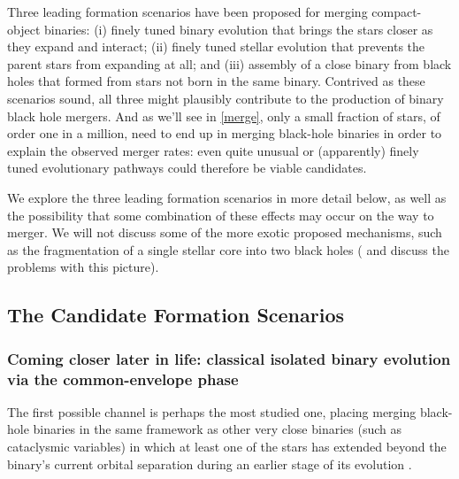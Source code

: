 \documentclass[review]{elsarticle}
\begin{document}
Three leading formation scenarios have been proposed for merging compact-object binaries: (i) finely tuned binary evolution that brings the stars closer as they expand and interact; (ii) finely tuned stellar evolution that prevents the parent stars from expanding at all; and (iii) assembly of a close binary from black holes that formed from stars not born in the same binary. Contrived as these scenarios sound, all three might plausibly contribute to the production of binary black hole mergers.  And as we'll see in \autoref{merge}, only a small fraction of stars, of order one in a million, need to end up in merging black-hole binaries in order to explain the observed merger rates: even quite unusual or (apparently) finely tuned evolutionary pathways could therefore be viable candidates.

We explore the three leading formation scenarios in more detail below, as well as the possibility that some combination of these effects may occur on the way to merger. We will not discuss some of the more exotic proposed mechanisms, such as the fragmentation of a single stellar core into two black holes \citep{Loeb:2016} (\citet{Woosley:2016} and \citet{Dai:2017} discuss the problems with this picture).  


\subsection{The Candidate Formation Scenarios}
\subsubsection{Coming closer later in life: classical isolated binary evolution via the common-envelope phase}
\label{form:isol}

The first possible channel is perhaps the most studied one, placing merging black-hole binaries in the same framework as other very close binaries (such as cataclysmic variables) in which at least one of the stars has extended beyond the binary's current orbital separation during an earlier stage of its evolution \citep[e.g.,][]{Paczynski:1976}. 
\end{document}
